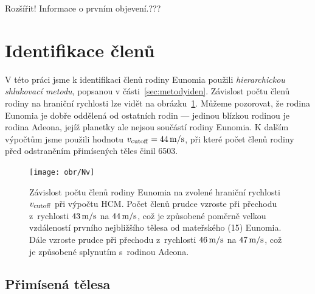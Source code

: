 \documentclass[A4paper, 12pt, oneside]{book}
\begin{document}
Rozšířit! Informace o prvním objevení.???

\section{Identifikace členů}

V této práci jsme k identifikaci členů rodiny Eunomia použili \textit{hierarchickou shlukovací metodu}, popsanou v části~\ref{sec:metodyiden}. Závislost počtu členů rodiny na hraniční rychlosti lze vidět na obrázku~\ref{fig:Nv}. Můžeme pozorovat, že rodina Eunomia je dobře oddělená od ostatních rodin --- jedinou blízkou rodinou je rodina Adeona, jejíž planetky ale nejsou součástí rodiny Eunomia. K dalším výpočtům jsme použili hodnotu $v_{\rm cutoff}=44\,{\rm m/s}$, při které počet členů rodiny před odstraněním přimísených těles činil 6503.

\begin{figure}
	\centering
	\texttt{[image: obr/Nv]}
	\caption{Závislost počtu členů rodiny Eunomia na zvolené hraniční rychlosti $v_{\rm cutoff}$ při výpočtu HCM\@. Počet členů prudce vzroste při přechodu z~rychlosti $43\,{\rm m/s}$ na $44\,{\rm m/s}$, což je způsobené poměrně velkou vzdáleností prvního nejbližšího tělesa od mateřského (15) Eunomia. Dále vzroste prudce při přechodu z~rychlosti $46\,{\rm m/s}$ na $47\,{\rm m/s}$, což je způsobené splynutím s~rodinou Adeona.}
	\label{fig:Nv}
\end{figure}

\subsection{Přimísená tělesa} \label{sec:interlopers}
\end{document}
